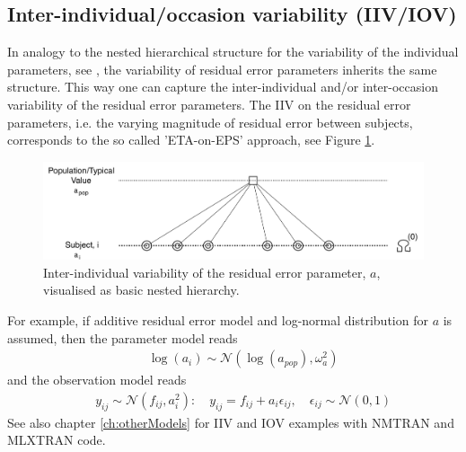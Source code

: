 \subsection{Inter-individual/occasion variability (IIV/IOV)}
\label{subsec:IIVonResidualError}
In analogy to the nested hierarchical structure for the variability of the 
individual parameters, see \cite{Pharmml_06}, the variability of residual 
error parameters inherits the same structure. This way one can capture 
the inter-individual and/or inter-occasion variability of the residual error parameters.
The IIV on the residual error parameters, i.e. the varying magnitude of 
residual error between subjects, corresponds to the so 
called 'ETA-on-EPS' approach, see Figure \ref{fig:IOV0_residualError}.

\begin{figure}[htb!]
\centering
  \includegraphics[width=140mm]{pics/IOV0_residualError.pdf}
 \caption{Inter-individual variability of the residual error parameter, $a$, visualised 
 as basic nested hierarchy.}
 \label{fig:IOV0_residualError}
\end{figure}

For example, if additive residual error model and log-normal distribution 
for $a$ is assumed, then the parameter model reads
\begin{eqnarray}
	&& \log(a_i) \sim \mathcal{N}(\log(a_{pop}) , \omega_a^2) \nonumber
\end{eqnarray}
and the observation model reads
\begin{eqnarray}
	&& y_{ij} \sim \mathcal{N}(f_{ij},a_i^2): \quad y_{ij} = f_{ij} + a_i \epsilon_{ij}, \quad \epsilon_{ij} \sim \mathcal{N}(0,1)	\nonumber
\end{eqnarray}
See also chapter \ref{ch:otherModels} for IIV and IOV examples with NMTRAN and MLXTRAN code.

